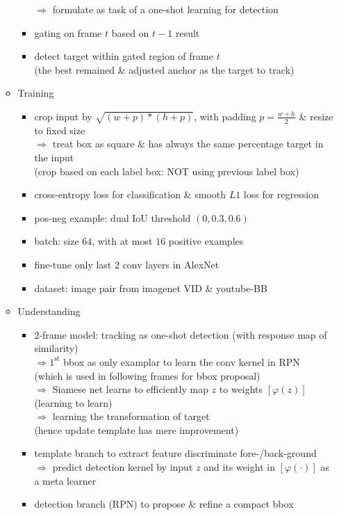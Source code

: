 \begin{itemize}
\begin{itemize}
\begin{itemize}
		$\Rightarrow$ formulate as task of a one-shot learning for detection
		\item gating on frame $t$ based on $t-1$ result
		\item detect target within gated region of frame $t$ \\
		(the best remained \& adjusted anchor as the target to track)
		\end{itemize}
	\item Training
		\begin{itemize}
		\item crop input by $\sqrt{(w+p)*(h+p)}$, with padding $p=\frac{w+h}2$ \& resize to fixed size \\
		$\Rightarrow$ treat box as square \& has always the same percentage  target in the input \\
		(crop based on each label box: NOT using previous label box)
		\item cross-entropy loss for classification \& smooth $L1$ loss for regression
		\item pos-neg example: dual IoU threshold $(0,0.3,0.6)$
		\item batch: size $64$, with at most $16$ positive examples
		\item fine-tune only last $2$ conv layers in AlexNet
		\item dataset: image pair from imagenet VID \& youtube-BB
		\end{itemize}
	\item Understanding
		\begin{itemize}
		\item $2$-frame model: tracking as one-shot detection (with response map of similarity) \\
		$\Rightarrow 1^\text{st}$ bbox as only examplar to learn the conv kernel in RPN \\
		(which is used in following frames for bbox proposal) \\
		$\Rightarrow$ Siamese net learns to efficiently map $z$ to weights $[\varphi (z)]$ (learning to learn) \\
		$\Rightarrow$ learning the transformation of target \\
		(hence update template has mere improvement)
		\item template branch to extract feature discriminate fore-/back-ground \\
		$\Rightarrow$ predict detection kernel by input $z$ and its weight in $[\varphi(\cdot)]$ as a meta learner
		\item detection branch (RPN) to propose \& refine a compact bbox \\ 

\end{itemize}
\end{itemize}
\end{itemize}
